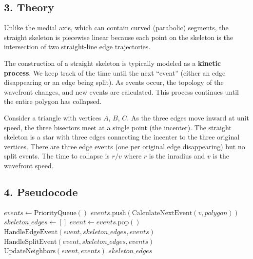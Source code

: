 \subsection{3. Theory}

Unlike the medial axis, which can contain curved (parabolic) segments, the straight skeleton is piecewise linear because each point on the skeleton is the intersection of two straight-line edge trajectories.

The construction of a straight skeleton is typically modeled as a \textbf{kinetic process}. We keep track of the time until the next ``event'' (either an edge disappearing or an edge being split). As events occur, the topology of the wavefront changes, and new events are calculated. This process continues until the entire polygon has collapsed.

\begin{example}\label{ex:straight_skeleton_triangle}
Consider a triangle with vertices $A$, $B$, $C$. As the three edges move inward at unit speed, the three bisectors meet at a single point (the incenter). The straight skeleton is a star with three edges connecting the incenter to the three original vertices. There are three edge events (one per original edge disappearing) but no split events. The time to collapse is $r / v$ where $r$ is the inradius and $v$ is the wavefront speed.
\end{example}

\subsection{4. Pseudocode}

\begin{algorithm}
\caption{Straight Skeleton}
\label{alg:straight_skeleton}
\begin{algorithmic}[1]
    \State $events \gets \text{PriorityQueue}()$
        \State $events.\text{push}(\text{CalculateNextEvent}(v, polygon))$
    \EndFor
    \State $skeleton\_edges \gets []$
        \State $event \gets events.\text{pop}()$
            \State $\text{HandleEdgeEvent}(event, skeleton\_edges, events)$
            \State $\text{HandleSplitEvent}(event, skeleton\_edges, events)$
        \EndIf
        \State $\text{UpdateNeighbors}(event, events)$
    \EndWhile
    \State \Return $skeleton\_edges$
\EndFunction
\end{algorithmic}
\end{algorithm}

